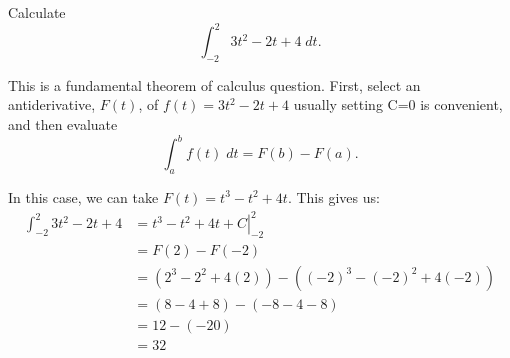 \documentclass{ximera}
\author{Emma Smith Zbarsky}
\begin{document}
\begin{exercise}

Calculate \[\int_{-2}^2 3t^2-2t+4\; dt.\]


\begin{hint}
This is a fundamental theorem of calculus question. First, select an
antiderivative, $F(t)$, of $f(t)=3t^2-2t+4$ usually setting C=0 is
convenient, and then evaluate \[\int_a^b f(t)\; dt = F(b)-F(a).\]
\end{hint}


\begin{hint}
In this case, we can take $F(t) = t^3-t^2+4t$. This gives us:
\begin{align*}
\int_{-2}^2 3t^2-2t+4 &= \left.t^3-t^2+4t + C\right|_{-2}^2 \\
&= F(2)-F(-2) \\
&= \left(2^3-2^2+4(2)\right)-\left((-2)^3-(-2)^2+4(-2)\right) \\
&= \left(8-4+8\right)-\left(-8-4-8\right) \\
&= 12-(-20) \\
&= 32
\end{align*}
\end{hint}


\begin{multipleChoice}
\end{multipleChoice}

\end{exercise}
\end{document}
